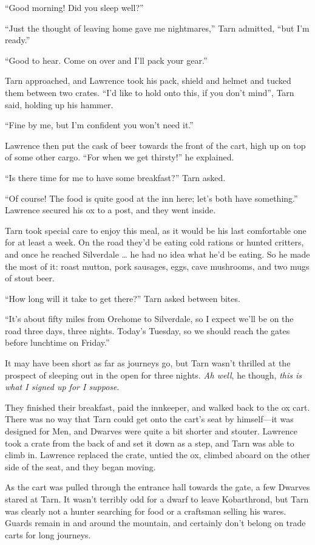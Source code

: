 ``Good morning!  Did you sleep well?''

``Just the thought of leaving home gave me nightmares,'' Tarn admitted, ``but I'm ready.''

``Good to hear.  Come on over and I'll pack your gear.''

Tarn approached, and Lawrence took his pack, shield and helmet and tucked them between two crates.  ``I'd like to hold onto this, if you don't mind'', Tarn said, holding up his hammer.

``Fine by me, but I'm confident you won't need it.''

Lawrence then put the cask of beer towards the front of the cart, high up on top of some other cargo.  ``For when we get thirsty!'' he explained.

``Is there time for me to have some breakfast?'' Tarn asked.

``Of course!  The food is quite good at the inn here; let's both have something.''  Lawrence secured his ox to a post, and they went inside.

Tarn took special care to enjoy this meal, as it would be his last comfortable one for at least a week.  On the road they'd be eating cold rations or hunted critters, and once he reached Silverdale \ldots{} he had no idea what he'd be eating.  So he made the most of it: roast mutton, pork sausages, eggs, cave mushrooms, and two mugs of stout beer.

``How long will it take to get there?'' Tarn asked between bites.

``It's about fifty miles from Orehome to Silverdale, so I expect we'll be on the road three days, three nights.  Today's Tuesday, so we should reach the gates before lunchtime on Friday.''

It may have been short as far as journeys go, but Tarn wasn't thrilled at the prospect of sleeping out in the open for three nights.  \emph{Ah well}, he though, \emph{this is what I signed up for I suppose}.

They finished their breakfast, paid the innkeeper, and walked back to the ox cart.
There was no way that Tarn could get onto the cart's seat by himself---it was designed for Men, and Dwarves were quite a bit shorter and stouter.  Lawrence took a crate from the back of and set it down as a step, and Tarn was able to climb in.  Lawrence replaced the crate, untied the ox, climbed aboard on the other side of the seat, and they began moving.

As the cart was pulled through the entrance hall towards the gate, a few Dwarves stared at Tarn.  It wasn't terribly odd for a dwarf to leave Kobarthrond, but Tarn was clearly not a hunter searching for food or a craftsman selling his wares.  Guards remain in and around the mountain, and certainly don't belong on trade carts for long journeys.

